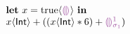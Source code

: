 


  \[\begin{array}{l}
    \ELet{x}{\ECast{\ETrue}{\THole}} \EInn \\
    \EPlus{\ECast{x}{\TInt}}{(\EPlus{(\ETimes{\ECast{x}{\TInt}}{6})}{\EEHole{1}})}
  \end{array}\]

